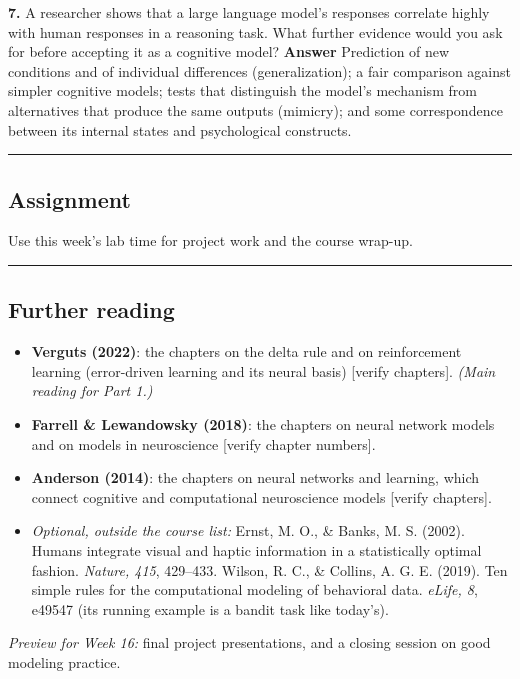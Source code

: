 \textbf{7.} A researcher shows that a large language model's responses
correlate highly with human responses in a reasoning task. What further
evidence would you ask for before accepting it as a cognitive model?
\textbf{Answer} Prediction of new conditions and of individual
differences (generalization); a fair comparison against simpler
cognitive models; tests that distinguish the model's mechanism from
alternatives that produce the same outputs (mimicry); and some
correspondence between its internal states and psychological constructs.

\begin{center}\rule{0.5\linewidth}{0.5pt}\end{center}

\subsection{Assignment}

Use this week's lab time for project work and the course wrap-up.

\begin{center}\rule{0.5\linewidth}{0.5pt}\end{center}

\subsection{Further reading}

\begin{itemize}
\tightlist
\item
  \textbf{Verguts (2022)}: the chapters on the delta rule and on
  reinforcement learning (error-driven learning and its neural basis)
  {[}verify chapters{]}. \emph{(Main reading for Part 1.)}
\item
  \textbf{Farrell \& Lewandowsky (2018)}: the chapters on neural network
  models and on models in neuroscience {[}verify chapter numbers{]}.
\item
  \textbf{Anderson (2014)}: the chapters on neural networks and
  learning, which connect cognitive and computational neuroscience
  models {[}verify chapters{]}.
\item
  \emph{Optional, outside the course list:} Ernst, M. O., \& Banks, M.
  S. (2002). Humans integrate visual and haptic information in a
  statistically optimal fashion. \emph{Nature, 415}, 429--433. Wilson,
  R. C., \& Collins, A. G. E. (2019). Ten simple rules for the
  computational modeling of behavioral data. \emph{eLife, 8}, e49547
  (its running example is a bandit task like today's).
\end{itemize}

\emph{Preview for Week 16:} final project presentations, and a closing
session on good modeling practice.
